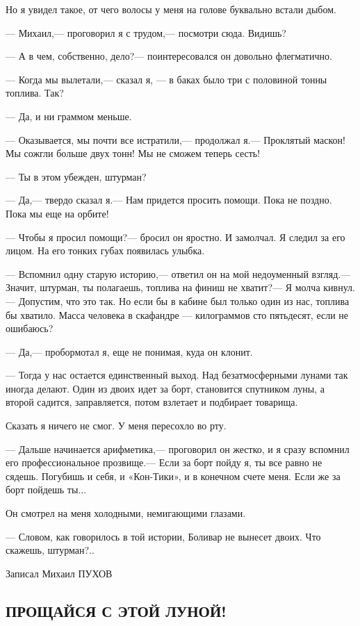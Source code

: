 \documentclass[11pt,a4paper,oneside]{article}
\begin{document}
Но я увидел такое, от чего волосы у меня на голове буквально встали дыбом.

— Михаил,— проговорил я с трудом,— посмотри сюда. Видишь?

— А в чем, собственно, дело?— поинтересовался он довольно флегматично.

— Когда мы вылетали,— сказал я, — в баках было три с половиной тонны топлива. Так?

— Да, и ни граммом меньше.

— Оказывается, мы почти все истратили,— продолжал я.— Проклятый маскон! Мы сожгли больше двух тонн! Мы не сможем теперь сесть!

— Ты в этом убежден, штурман?

— Да,— твердо сказал я.— Нам придется просить помощи. Пока не поздно. Пока мы еще на орбите!

— Чтобы я просил помощи?— бросил он яростно. И замолчал. Я следил за его лицом. На его тонких губах появилась улыбка.

— Вспомнил одну старую историю,— ответил он на мой недоуменный взгляд.— Значит, штурман, ты полагаешь, топлива на финиш не хватит?— Я молча кивнул.— Допустим, что это так. Но если бы в кабине был только один из нас, топлива бы хватило. Масса человека в скафандре — килограммов сто пятьдесят, если не ошибаюсь?

— Да,— пробормотал я, еще не понимая, куда он клонит.

— Тогда у нас остается единственный выход. Над безатмосферными лунами так иногда делают. Один из двоих идет за борт, становится спутником луны, а второй садится, заправляется, потом взлетает и подбирает товарища.

Сказать я ничего не смог. У меня пересохло во рту.

— Дальше начинается арифметика,— проговорил он жестко, и я сразу вспомнил его профессиональное прозвище.— Если за борт пойду я, ты все равно не сядешь. Погубишь и себя, и «Кон-Тики», и в конечном счете меня. Если же за борт пойдешь ты...

Он смотрел на меня холодными, немигающими глазами.

— Словом, как говорилось в той истории, Боливар не вынесет двоих. Что скажешь, штурман?..

Записал Михаил ПУХОВ

\subsection{ПРОЩАЙСЯ С ЭТОЙ ЛУНОЙ!}
\label{goodby_moon}
\end{document}
